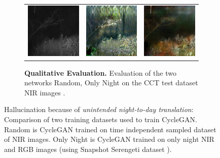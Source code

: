 \documentclass[a4paper,11pt, DIV=12]{scrartcl}
\begin{document}
\begin{figure}[ht]
\begin{subfigure}{0.65\textwidth}
\begin{tabularx}{\textwidth}{>{\centering\arraybackslash}X >{\centering\arraybackslash}X >{\centering\arraybackslash}X}
         \includegraphics{588c13ba-23d2-11e8-a6a3-ec086b02610b_real.png} & \includegraphics{588c13ba-23d2-11e8-a6a3-ec086b02610b_hal.png} & \includegraphics{588c13ba-23d2-11e8-a6a3-ec086b02610b_without_hal.png}
      \end{tabularx}
      \caption{
         \textbf{Qualitative Evaluation.} Evaluation of the two networks Random, Only Night on the CCT test dataset NIR images \cite{caltech}.
      }
      \label{fig:hallucation-night-day-qual}
   \end{subfigure}
   \caption{
      Hallucination because of \textit{unintended night-to-day translation}: 
      Comparison of two training datasets used to train CycleGAN. Random is CycleGAN trained on time independent sampled dataset of NIR images.
      Only Night is CycleGAN trained on only night NIR and RGB images (using Snapshot Serengeti dataset \cite{serengeti}).
   }
   \label{fig:hallucincation-night-day}
\end{figure}
\end{document}
